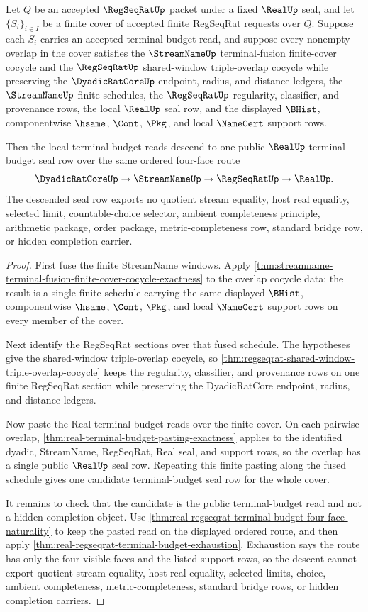 \begin{theorem}
\label{thm:real-terminal-budget-finite-cover-descent}
Let $Q$ be an accepted $\RegSeqRatUp$ packet under a fixed $\RealUp$ seal, and
let $\{S_i\}_{i \in I}$ be a finite cover of accepted finite RegSeqRat requests
over $Q$. Suppose each $S_i$ carries an accepted terminal-budget read, and
suppose every nonempty overlap in the cover satisfies the
$\StreamNameUp$ terminal-fusion finite-cover cocycle and the $\RegSeqRatUp$
shared-window triple-overlap cocycle while preserving the
$\DyadicRatCoreUp$ endpoint, radius, and distance ledgers, the $\StreamNameUp$
finite schedules, the $\RegSeqRatUp$ regularity, classifier, and provenance rows,
the local $\RealUp$ seal row, and the displayed $\BHist$, componentwise
$\hsame$, $\Cont$, $\Pkg$, and local $\NameCert$ support rows.

Then the local terminal-budget reads descend to one public $\RealUp$
terminal-budget seal row over the same ordered four-face route
$$
\DyadicRatCoreUp \to \StreamNameUp \to \RegSeqRatUp \to \RealUp .
$$
The descended seal row exports no quotient stream equality, host real equality,
selected limit, countable-choice selector, ambient completeness principle,
arithmetic package, order package, metric-completeness row, standard bridge
row, or hidden completion carrier.
\end{theorem}
\begin{proof}
First fuse the finite StreamName windows. Apply
\autoref{thm:streamname-terminal-fusion-finite-cover-cocycle-exactness} to the
overlap cocycle data; the result is a single finite schedule carrying the same
displayed $\BHist$, componentwise $\hsame$, $\Cont$, $\Pkg$, and local
$\NameCert$ support rows on every member of the cover.

Next identify the RegSeqRat sections over that fused schedule. The hypotheses
give the shared-window triple-overlap cocycle, so
\autoref{thm:regseqrat-shared-window-triple-overlap-cocycle} keeps the
regularity, classifier, and provenance rows on one finite RegSeqRat section
while preserving the DyadicRatCore endpoint, radius, and distance ledgers.

Now paste the Real terminal-budget reads over the finite cover. On each
pairwise overlap, \autoref{thm:real-terminal-budget-pasting-exactness} applies
to the identified dyadic, StreamName, RegSeqRat, Real seal, and support rows,
so the overlap has a single public $\RealUp$ seal row. Repeating this finite
pasting along the fused schedule gives one candidate terminal-budget seal row
for the whole cover.

It remains to check that the candidate is the public terminal-budget read and
not a hidden completion object. Use
\autoref{thm:real-regseqrat-terminal-budget-four-face-naturality} to keep the
pasted read on the displayed ordered route, and then apply
\autoref{thm:real-regseqrat-terminal-budget-exhaustion}. Exhaustion says the
route has only the four visible faces and the listed support rows, so the
descent cannot export quotient stream equality, host real equality, selected
limits, choice, ambient completeness, metric-completeness, standard bridge
rows, or hidden completion carriers.
\end{proof}
